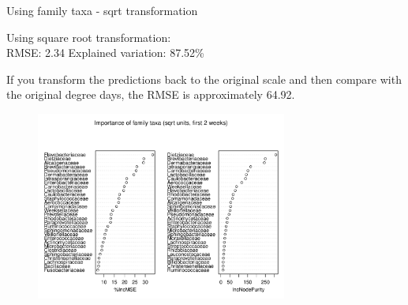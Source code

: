 \documentclass{beamer}
\begin{document}
\begin{frame}{Using family taxa - sqrt transformation}

  {\scriptsize
    
  \noindent Using square root transformation:\\
  RMSE: 2.34  \hspace{0.05in}  Explained variation: 87.52\%

  \vspace{0.05in}
  
  \noindent If you transform the predictions back to the original
  scale and then compare with the original degree days, the RMSE is
  approximately 64.92.
  
\begin{center}
\begin{figure}
  \includegraphics[width=3.25in]{../only_families/first_two_weeks/sqrt_units_first_two_weeks_families_imp_plot}
\end{figure}
\end{center}
\vspace{-0.25in}
}
  
\end{frame}
\end{document}
